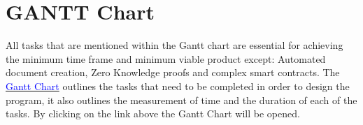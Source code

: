 \let\textcircled=\pgftextcircled
\chapter{GANTT Chart}

All tasks that are mentioned within the Gantt chart are essential for achieving the minimum time frame and minimum viable product except: Automated document creation, Zero Knowledge proofs and complex smart contracts. The \href{run:./gantt.xlsx}{\textcolor{blue}{Gantt Chart}} outlines the tasks that need to be completed in order to design the program, it also outlines the measurement of time and the duration of each of the tasks. By clicking on the link above the Gantt Chart will be opened.
